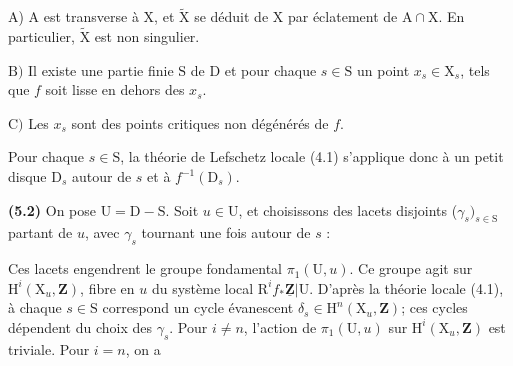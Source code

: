 \documentclass[10pt,leqno]{article}
\begin{document}
\noindent A) \(\mathrm{A}\) est transverse à \(\mathrm{X}\), et \(\widetilde{\mathrm{X}}\) se déduit de \(\mathrm{X}\) par éclatement de \(\mathrm{A}\cap \mathrm{X}\). En particulier, \(\widetilde{\mathrm{X}}\) est non singulier.\par

\noindent \(\mathrm{B})\) Il existe une partie finie \(\mathrm{S}\) de \(\mathrm{D}\) et pour chaque \(s\in \mathrm{S}\) un point \(x_{s}\in \mathrm{X}_{s}\), tels que \(f\) soit lisse en dehors des \(x_{s}\).\par

\noindent \(\mathrm{C})\) Les \(x_{s}\) sont des points critiques non dégénérés de \(f\).\par

\noindent Pour chaque \(s\in \mathrm{S}\), la théorie de Lefschetz locale (4.1) s’applique donc à un petit disque \(\mathrm{D}_{s}\) autour de \(s\) et à \(f^{- 1}(\mathrm{D}_{s})\).\par

\noindent \textbf{(5.2)} On pose \(\mathrm{U}=\mathrm{D}- \mathrm{S}\). Soit \(u\in \mathrm{U}\), et choisissons des lacets disjoints (\(\gamma _{s})_{s\in \mathrm{S}}\) partant de \(u\), avec \(\gamma _{s}\) tournant une fois autour de \(s\) :\par

\begin{center}
\end{center}

\noindent Ces lacets engendrent le groupe fondamental \(\pi _{1}(\mathrm{U},u)\). Ce groupe agit sur \(\mathrm{H}^{i}(\mathrm{X}_{u},\mathbf{Z})\), fibre en \(u\) du système local \(\mathrm{R}^{i} f_{*}\underline{\mathbf{Z}}|\mathrm{U}\). D’après la théorie locale (4.1), à chaque \(s\in \mathrm{S}\) correspond un cycle évanescent \(\delta _{s}\in \mathrm{H}^{n}(\mathrm{X}_{u},\mathbf{Z})\); ces cycles dépendent du choix des \(\gamma _{s}\). Pour \(i\ne n\), l’action de \(\pi _{1}(\mathrm{U},u)\) sur \(\mathrm{H}^{i}(\mathrm{X}_{u},\mathbf{Z})\) est triviale. Pour \(i=n\), on a\par
\end{document}
